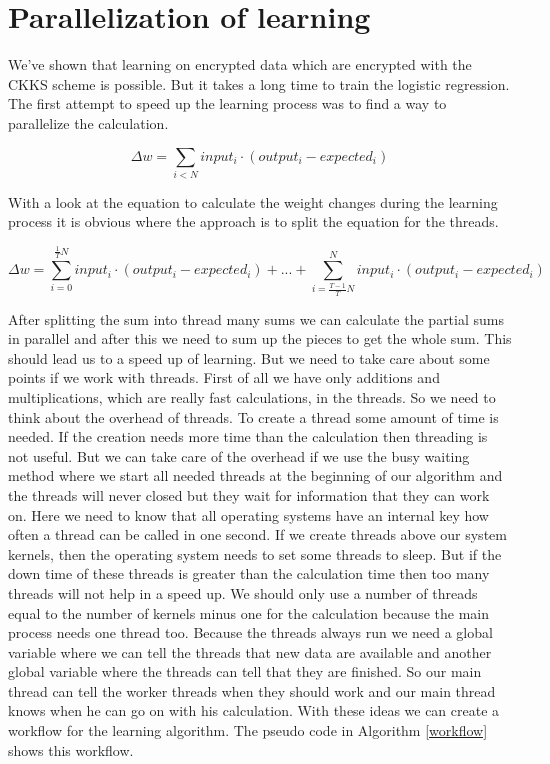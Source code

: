 \section{Parallelization of learning}\label{parallel}
\begin{text}
    \indent We've shown that learning on encrypted data which are encrypted with the CKKS scheme is possible. But it takes a long time to train the logistic regression. \newline
    \noindent The first attempt to speed up the learning process was to find a way to parallelize the calculation.

    $$\Delta w = \sum_{i<N} input_i \cdot (output_i-expected_i)$$

    \noindent With a look at the equation to calculate the weight changes during the learning process it is obvious where the approach is to split the equation for the threads. 
        
    $$\Delta w = \sum_{i=0}^{\frac{1}{T}N} input_i \cdot (output_i-expected_i) +...+\sum_{i=\frac{T-1}{T}N}^{N} input_i \cdot (output_i-expected_i)$$ 
    
    \noindent After splitting the sum into thread many sums we can calculate the partial sums in parallel and after this we need to sum up the pieces to get the whole sum. This should lead us to a speed up of learning. But we need to take care about some points if we work with threads.\newline
    \indent First of all we have only additions and multiplications, which are really fast calculations, in the threads. So we need to think about the overhead of threads. To create a thread some amount of time is needed. If the creation needs more time than the calculation then threading is not useful. But we can take care of the overhead if we use the busy waiting method where we start all needed threads at the beginning of our algorithm and the threads will never closed but they wait for information that they can work on. Here we need to know that all operating systems have an internal key how often a thread can be called in one second. If we create threads above our system kernels, then the operating system needs to set some threads to sleep. But if the down time of these threads is greater than the calculation time then too many threads will not help in a speed up. We should only use a number of threads equal to the number of kernels minus one for the calculation because the main process needs one thread too. Because the threads always run we need a global variable where we can tell the threads that new data are available and another global variable where the threads can tell that they are finished. So our main thread can tell the worker threads when they should work and our main thread knows when he can go on with his calculation. With these ideas we can create a workflow for the learning algorithm. The pseudo code in Algorithm \ref{workflow} shows this workflow. \newline
    

\end{text}
